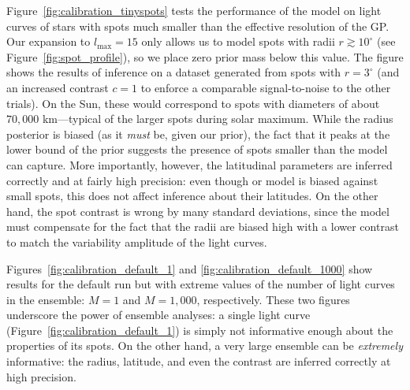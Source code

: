 \documentclass[modern]{aastex62}
\begin{document}
Figure~\ref{fig:calibration_tinyspots} tests the performance of the model
on light curves of stars with spots much smaller than the effective resolution
of the GP. Our expansion to $l_\mathrm{max} = 15$ only allows us to model spots
with radii $r \gtrsim 10^\circ$ (see Figure~\ref{fig:spot_profile}), so we
place zero prior mass below this value. The figure shows the results of inference
on a dataset generated from spots with $r = 3^\circ$ (and an increased
contrast $c = 1$ to enforce a comparable signal-to-noise to the other trials).
On the Sun, these would correspond to spots with diameters of about
$70{,}000$ km---typical of the larger spots during solar maximum.
While the radius posterior is biased (as it \emph{must} be, given our prior),
the fact that it peaks at the lower bound of the prior suggests the presence
of spots smaller than the model can capture. More importantly, however, the
latitudinal parameters are inferred correctly and at fairly high precision:
even though or model is biased against small spots, this does not affect
inference about their latitudes. On the other hand, the spot contrast is wrong
by many standard deviations, since the model must compensate for the fact
that the radii are biased high with a lower contrast to match the variability
amplitude of the light curves.

Figures~\ref{fig:calibration_default_1} and \ref{fig:calibration_default_1000}
show results for the default run but with extreme values of the number of
light curves in the ensemble: $M = 1$ and $M = 1{,}000$, respectively.
These two figures underscore the power of ensemble analyses: a single light
curve (Figure~\ref{fig:calibration_default_1}) is simply not informative
enough about the properties of its spots. On the other hand, a very large
ensemble can be \emph{extremely} informative: the radius, latitude, and even
the contrast are inferred correctly at high precision.
\end{document}
